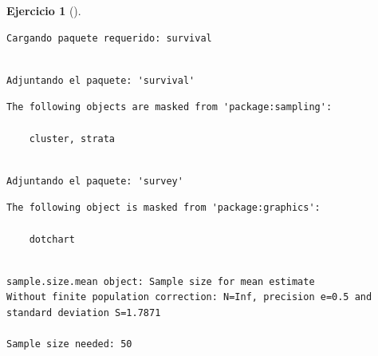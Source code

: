 \documentclass[
  a4paper,
]{scrreport}
\newenvironment{Shaded}{\begin{snugshade}}{\end{snugshade}}
\newcommand{\AttributeTok}[1]{\textcolor[rgb]{0.40,0.45,0.13}{#1}}
\newcommand{\FloatTok}[1]{\textcolor[rgb]{0.68,0.00,0.00}{#1}}
\newcommand{\FunctionTok}[1]{\textcolor[rgb]{0.28,0.35,0.67}{#1}}
\newcommand{\NormalTok}[1]{\textcolor[rgb]{0.00,0.23,0.31}{#1}}
\newcommand{\SpecialCharTok}[1]{\textcolor[rgb]{0.37,0.37,0.37}{#1}}
\theoremstyle{definition}
\newtheorem{exercise}{Ejercicio}[chapter]
\theoremstyle{remark}
\begin{document}
\begin{exercise}[]
\begin{enumerate}
\begin{tcolorbox}
\begin{verbatim}
Cargando paquete requerido: survival
\end{verbatim}

\begin{verbatim}

Adjuntando el paquete: 'survival'
\end{verbatim}

\begin{verbatim}
The following objects are masked from 'package:sampling':

    cluster, strata
\end{verbatim}

\begin{verbatim}

Adjuntando el paquete: 'survey'
\end{verbatim}

\begin{verbatim}
The following object is masked from 'package:graphics':

    dotchart
\end{verbatim}

\begin{Shaded}
\end{Shaded}

\begin{verbatim}

sample.size.mean object: Sample size for mean estimate
Without finite population correction: N=Inf, precision e=0.5 and standard deviation S=1.7871

Sample size needed: 50
\end{verbatim}

  \end{tcolorbox}
\end{enumerate}

\end{exercise}
\end{document}

